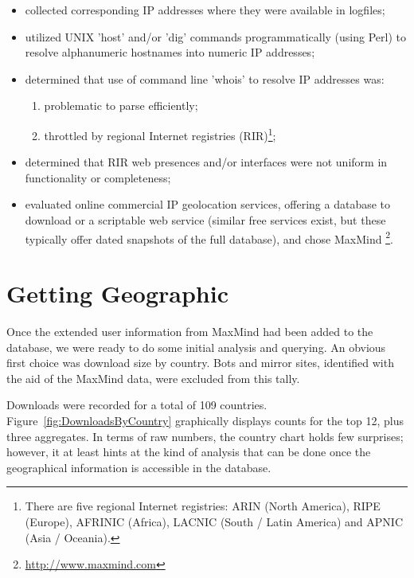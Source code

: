 \begin{itemize}

\item collected corresponding IP addresses where they were available in logfiles;

\item utilized UNIX 'host' and/or 'dig' commands programmatically (using Perl) to resolve alphanumeric
hostnames into numeric IP addresses;

\item determined that use of command line 'whois' to resolve IP addresses was:

\begin{enumerate}

\item problematic to parse efficiently;

\item throttled by regional Internet registries (RIR)\footnote{There are 
five regional Internet registries: ARIN (North America), RIPE (Europe), 
AFRINIC (Africa), LACNIC (South / Latin America) and APNIC (Asia / 
Oceania).};

\end{enumerate}

\item determined that RIR web presences and/or interfaces were not uniform in functionality or
completeness;

\item evaluated online commercial IP geo\-location services, offering a database 
to download or a scriptable web service (similar free services exist, but these 
typically offer dated snapshots of the full database), and chose 
MaxMind \footnote{\url{http://www.maxmind.com}}.

\end{itemize}

\section{Getting Geographic}

Once the extended user information from MaxMind had been added to the database, we
were ready to do some initial analysis and querying. An obvious first choice was download
size by country. Bots and mirror sites, identified with the aid of the MaxMind data, were
excluded from this tally.

Downloads were recorded for a total of 109 countries. Figure~\ref{fig:DownloadsByCountry} graphically displays counts
for the top 12, plus three aggregates. In terms of raw numbers, the country chart holds 
few surprises; however, it at least hints at the kind of analysis that can be done once 
the geographical information is accessible in the database.


